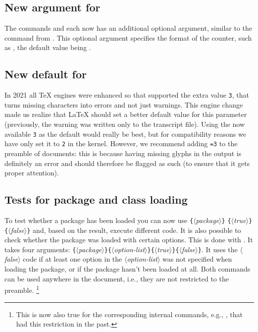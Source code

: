 \documentclass{ltnews}
\providecommand\meta[1]{$\langle$\textrm{\itshape#1}$\rangle$}
\providecommand\Arg[1]{\texttt\{\meta{#1}\texttt\}}
\begin{document}
\subsection{New argument for }

The commands  and  each now has
an additional optional argument, similar to the command 
  from .  
This optional argument 
specifies the format of the counter, such as , 
the default value being .




\subsection{New default for }

In 2021 all \TeX{} engines were enhanced so that  
supported the extra value \texttt{3}, that turns missing
characters into errors and not just warnings. 
%
This engine change made us
realize that \LaTeX{} should set a better default value for this parameter
(previously, the warning was written only to the transcript file).
Using the now available \texttt{3} as the default would really be best, but for
compatibility reasons we have only set it to \texttt{2} in the kernel.
%
However, we recommend adding \texttt{=3} to the
preamble of documents: this is because having missing glyphs in the output is definitely an
error and should therefore be flagged as such (to ensure that it gets proper attention).



\subsection{Tests for package and class loading}

To test whether a package has been loaded you can now use 
\Arg{package} \Arg{true} \Arg{false} and, based on the result, execute
different code. It is also possible to check whether the package was loaded
with certain options. This is done with
. It takes four arguments:
\Arg{package}\Arg{option-list}\Arg{true}\Arg{false}. 
%
It uses the \meta{false} code if at least one option in 
the \meta{option-list} was 
not specified when loading the package, or if the package 
hasn't been loaded at all.
%
Both commands can be used anywhere in the document, i.e., 
they are not restricted to the preamble.%
\footnote{This is now also true for the
  corresponding internal commands, e.g., , that
  had this restriction in the past.}
\end{document}
